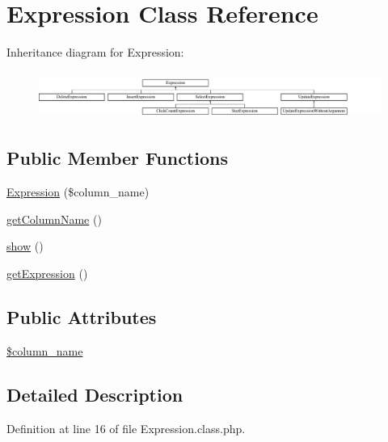 \hypertarget{classExpression}{\section{Expression Class Reference}
\label{classExpression}
}
Inheritance diagram for Expression\-:\begin{figure}[H]
\begin{center}
\leavevmode
\includegraphics[height=1.555556cm]{classExpression}
\end{center}
\end{figure}
\subsection*{Public Member Functions}
\begin{DoxyCompactItemize}
\item 
\hyperlink{classExpression_a059a95604c7c5251b6afc25203d4c417}{Expression} (\$column\-\_\-name)
\item 
\hyperlink{classExpression_a1822fc4ae1532c280ed017265aff00d7}{get\-Column\-Name} ()
\item 
\hyperlink{classExpression_abe2ca73915eb11fbfbc67d14b610bace}{show} ()
\item 
\hyperlink{classExpression_aac1c43a04af3c8208e48e4a67283ff81}{get\-Expression} ()
\end{DoxyCompactItemize}
\subsection*{Public Attributes}
\begin{DoxyCompactItemize}
\item 
\hyperlink{classExpression_aa097fe1e0f08ca2a83341acc172811dd}{\$column\-\_\-name}
\end{DoxyCompactItemize}


\subsection{Detailed Description}


Definition at line 16 of file Expression.\-class.\-php.



